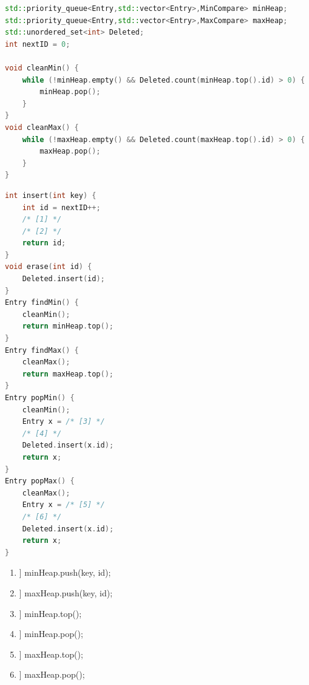 \begin{parts}
\begin{lstlisting}[language=C++]
std::priority_queue<Entry,std::vector<Entry>,MinCompare> minHeap;
std::priority_queue<Entry,std::vector<Entry>,MaxCompare> maxHeap;
std::unordered_set<int> Deleted;
int nextID = 0;

void cleanMin() {
    while (!minHeap.empty() && Deleted.count(minHeap.top().id) > 0) {
        minHeap.pop();
    }
}
void cleanMax() {
    while (!maxHeap.empty() && Deleted.count(maxHeap.top().id) > 0) {
        maxHeap.pop();
    }
}

\end{lstlisting}
\newpage
\begin{lstlisting}[language=C++]
int insert(int key) {
    int id = nextID++;
    /* [1] */
    /* [2] */
    return id;
}
void erase(int id) {
    Deleted.insert(id);
}
Entry findMin() {
    cleanMin();
    return minHeap.top();
}
Entry findMax() {
    cleanMax();
    return maxHeap.top();
}
Entry popMin() {
    cleanMin();
    Entry x = /* [3] */
    /* [4] */
    Deleted.insert(x.id);
    return x;
}
Entry popMax() {
    cleanMax();
    Entry x = /* [5] */
    /* [6] */
    Deleted.insert(x.id);
    return x;
}
\end{lstlisting}

\begin{solution}
\begin{enumerate}
    \item[[1]] minHeap.push({key, id});
    \item[[2]] maxHeap.push({key, id});
    \item[[3]] minHeap.top();
    \item[[4]] minHeap.pop();
    \item[[5]] maxHeap.top();
    \item[[6]] maxHeap.pop();
\end{enumerate}
\end{solution}
\end{parts}

